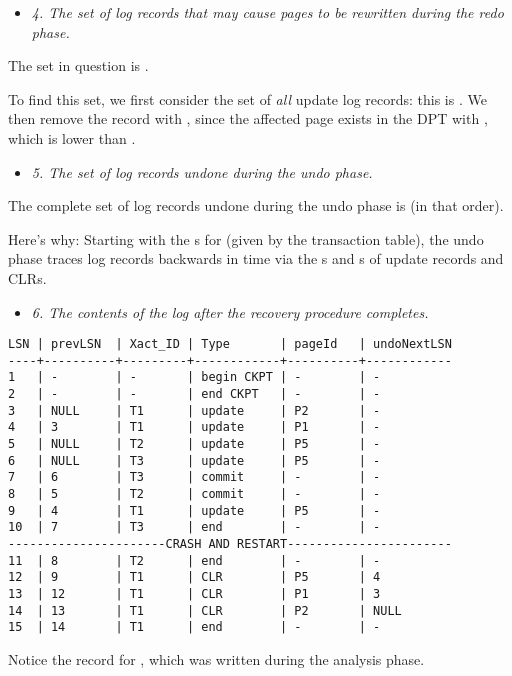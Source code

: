 \streg

\begin{itemize}
  \item \textit{4. The set of log records that may cause pages to be rewritten
    during the redo phase.}
\end{itemize}

The set in question is .
\medskip

To find this set, we first consider the set of \textit{all} update log records:
this is . We then remove the record with , since
the affected page exists in the DPT with , which is lower than
.

\begin{itemize}
  \item \textit{5. The set of log records undone during the undo phase.}
\end{itemize}

The complete set of log records undone during the undo phase is 
(in that order).
\medskip

Here's why: Starting with the s for  (given by the
transaction table), the undo phase traces log records backwards in time via the
s and s of update records and CLRs.
\streg

\begin{itemize}
  \item \textit{6. The contents of the log after the recovery procedure
    completes.}
\end{itemize}

\begin{verbatim}
LSN | prevLSN  | Xact_ID | Type       | pageId   | undoNextLSN
----+----------+---------+------------+----------+------------
1   | -        | -       | begin CKPT | -        | -
2   | -        | -       | end CKPT   | -        | -
3   | NULL     | T1      | update     | P2       | -
4   | 3        | T1      | update     | P1       | -
5   | NULL     | T2      | update     | P5       | -
6   | NULL     | T3      | update     | P5       | -
7   | 6        | T3      | commit     | -        | -
8   | 5        | T2      | commit     | -        | -
9   | 4        | T1      | update     | P5       | -
10  | 7        | T3      | end        | -        | -
----------------------CRASH AND RESTART-----------------------
11  | 8        | T2      | end        | -        | -
12  | 9        | T1      | CLR        | P5       | 4
13  | 12       | T1      | CLR        | P1       | 3
14  | 13       | T1      | CLR        | P2       | NULL
15  | 14       | T1      | end        | -        | -
\end{verbatim}

Notice the  record for , which was written during the analysis
phase.

\tykstreg
